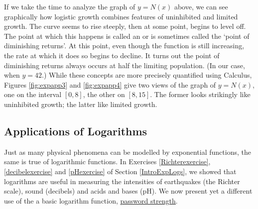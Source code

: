 If we take the time to analyze the graph of $y=N(x)$ above, we can see graphically how logistic growth combines  features of uninhibited and limited growth.  The curve seems to rise steeply, then at some point, begins to level off.  The point at which this happens is called an    or is sometimes called the `point of diminishing returns'.  At this point, even though the function is still increasing, the rate at which it does so begins to decline.  It turns out the point of diminishing returns always occurs at half the limiting population.  (In our case, when $y=42$.)  While these concepts are more precisely quantified using Calculus, Figures \ref{fig:expapp3} and \ref{fig:expapp4} give two views of the graph of $y=N(x)$, one on the interval $[0,8]$, the other on $[8,15]$. The former looks strikingly like uninhibited growth; the latter like limited growth.



\pagebreak

\subsection{Applications of Logarithms}

Just as many physical phenomena can be modelled by exponential functions, the same is true of logarithmic functions.   In Exercises \ref{Richterexercise},  \ref{decibelexercise} and \ref{pHexercise} of Section \ref{IntroExpLogs}, we showed that logarithms are useful in measuring the intensities of earthquakes (the Richter scale), sound (decibels) and acids and bases (pH).  We now present yet a different use of the a basic logarithm function, \href{http://en.wikipedia.org/wiki/Password_strength}{\underline{password strength}}.

\medskip

